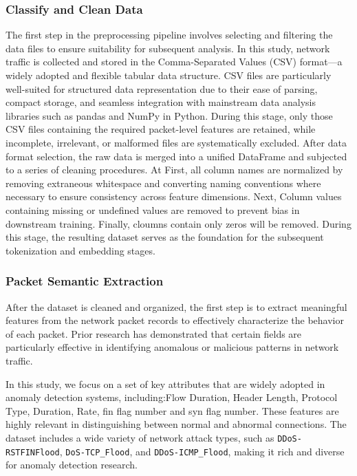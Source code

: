 \begin{ZhChapter}
\subsubsection{Classify and Clean Data}

The first step in the preprocessing pipeline involves selecting and filtering the data files to ensure suitability for subsequent analysis. In this study, network traffic is collected and stored in the Comma-Separated Values (CSV) format—a widely adopted and flexible tabular data structure. CSV files are particularly well-suited for structured data representation due to their ease of parsing, compact storage, and seamless integration with mainstream data analysis libraries such as pandas and NumPy in Python. During this stage, only those CSV files containing the required packet-level features are retained, while incomplete, irrelevant, or malformed files are systematically excluded. After data format selection, the raw data is merged into a unified DataFrame and subjected to a series of cleaning procedures. At First, all column names are normalized by removing extraneous whitespace and converting naming conventions where necessary to ensure consistency across feature dimensions. Next, Column values containing missing or undefined values are removed to prevent bias in downstream training. Finally, cloumns contain only zeros will be removed.  During this stage, the resulting dataset serves as the foundation for the subsequent tokenization and embedding stages.

\subsubsection{Packet Semantic Extraction}

After the dataset is cleaned and organized, the first step is to extract meaningful features from the network packet records to effectively characterize the behavior of each packet. Prior research has demonstrated that certain fields are particularly effective in identifying anomalous or malicious patterns in network traffic.

In this study, we focus on a set of key attributes that are widely adopted in anomaly detection systems, including:Flow Duration, Header Length, Protocol Type, Duration, Rate, fin flag number and syn flag number. These features are highly relevant in distinguishing between normal and abnormal connections. The dataset includes a wide variety of network attack types, such as \texttt{DDoS-RSTFINFlood}, \texttt{DoS-TCP\_Flood}, and \texttt{DDoS-ICMP\_Flood}, making it rich and diverse for anomaly detection research.


\end{ZhChapter}
